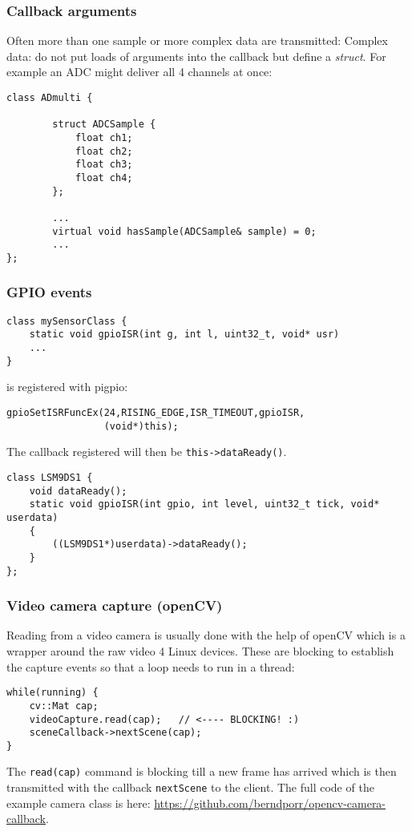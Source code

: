 \documentclass[xcolor=dvipsnames]{beamer}
\begin{document}
\begin{frame}[fragile]
    \frametitle{Callback arguments}
Often more than one sample or more complex data are transmitted:
Complex data: do not put loads of arguments into the
  callback but define a \textsl{struct}. For example an ADC might
  deliver all 4 channels at once:
\begin{verbatim}
class ADmulti {

        struct ADCSample {
            float ch1;
            float ch2;
            float ch3;
            float ch4;
        };

        ...
        virtual void hasSample(ADCSample& sample) = 0;
        ...
};
\end{verbatim}
\end{frame}



\begin{frame}[fragile]
    \frametitle{GPIO events}

    \begin{verbatim}
class mySensorClass {
    static void gpioISR(int g, int l, uint32_t, void* usr)
    ...
}
        \end{verbatim}
        is registered with pigpio:
        \begin{verbatim}
gpioSetISRFuncEx(24,RISING_EDGE,ISR_TIMEOUT,gpioISR,
                 (void*)this);
        \end{verbatim}
        The callback registered will then be \texttt{this->dataReady()}.
        \begin{verbatim}
class LSM9DS1 {
    void dataReady();
    static void gpioISR(int gpio, int level, uint32_t tick, void* userdata)
    {
        ((LSM9DS1*)userdata)->dataReady();
    }
};
        \end{verbatim}

    \end{frame}




    \begin{frame}[fragile]
\frametitle{Video camera capture (openCV)}
Reading from a video camera is usually done with the help of openCV
which is a wrapper around the raw video 4 Linux devices. These are
blocking to establish the capture events so that a loop needs to run in
a thread:
\begin{verbatim}
while(running) {
    cv::Mat cap;
    videoCapture.read(cap);   // <---- BLOCKING! :)
    sceneCallback->nextScene(cap);
}
\end{verbatim}
The \texttt{read(cap)} command is blocking till a new frame has
arrived which is then transmitted with the callback \texttt{nextScene}
to the client. The full code of the example camera class is here:
\url{https://github.com/berndporr/opencv-camera-callback}.
\end{frame}
\end{document}
